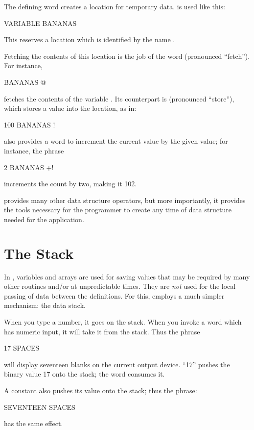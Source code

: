 {\sloppy
The defining word  creates a location
for temporary data.  is used like this:
\begin{Code}
VARIABLE BANANAS
\end{Code}
This reserves a location which is identified by the name .}

Fetching the contents of this location is the job of the word 
(pronounced ``fetch'').  For instance,
\begin{Code}
BANANAS @
\end{Code}
fetches the contents of the variable .  Its counterpart is \forthb{!}
(pronounced ``store''), which stores a value into the location, as in:
\begin{Code}
100 BANANAS !
\end{Code}
\Forth{} also provides a word to increment the current value by the given
value; for instance, the phrase
\begin{Code}
2 BANANAS +!
\end{Code}
increments the count by two, making it 102.

\Forth{} provides many other
data structure operators, but more
importantly, it provides the tools necessary for the programmer to
create any time of data structure needed for the application.%
%

\section{The Stack}
In \Forth{}, variables and arrays are used for saving values that may be
required by many other routines and/or at unpredictable times.  They are {\em not}
used for the local passing of data between the definitions.  For this, \Forth{}
employs a much simpler mechanism: the data stack.

When you type a number, it goes on the stack.  When you invoke a 
word which has numeric input, it will take it from the stack.  Thus the
phrase
\begin{Code}
17 SPACES
\end{Code}
will display seventeen blanks on the current output device.  ``17'' pushes
the binary value 17 onto the stack; the word  consumes it.

A constant also pushes its value onto the stack; thus the phrase:
\begin{Code}
SEVENTEEN SPACES
\end{Code}
has the same effect.

